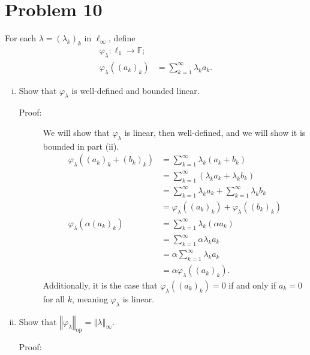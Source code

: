 \documentclass[8pt]{extarticle}
\newcommand{\norm}[1]{\left\Vert #1\right\Vert}
\begin{document}
  \section{Problem 10}%
  For each $\lambda = (\lambda_k)_k$ in $\ell_{\infty}$, define
  \begin{align*}
    \varphi_{\lambda}: \ell_1 \rightarrow \mathbb{F};\\
    \varphi_{\lambda}((a_k)_k) &= \sum_{k=1}^{\infty}\lambda_ka_k.
  \end{align*}
  \begin{enumerate}[(i)]
    \item Show that $\varphi_{\lambda}$ is well-defined and bounded linear.
      \begin{description}
        \item[Proof:] We will show that $\varphi_{\lambda}$ is linear, then well-defined, and we will show it is bounded in part (ii).
          \begin{align*}
            \varphi_{\lambda}((a_k)_k + (b_k)_k) &= \sum_{k=1}^{\infty}\lambda_k(a_k + b_k)\\
                                                 &= \sum_{k=1}^{\infty}\left(\lambda_ka_k + \lambda_kb_k\right)\\
                                                 &= \sum_{k=1}^{\infty}\lambda_ka_k + \sum_{k=1}^{\infty}\lambda_kb_k\\
                                                 &= \varphi_{\lambda}((a_k)_k) +\varphi_{\lambda}((b_k)_k)\\
            \varphi_{\lambda}(\alpha(a_k)_k) &= \sum_{k=1}^{\infty}\lambda_k(\alpha a_k)\\
                                             &= \sum_{k=1}^{\infty}\alpha\lambda_ka_k\\
                                             &= \alpha\sum_{k=1}^{\infty}\lambda_ka_k\\
                                             &= \alpha\varphi_{\lambda}((a_k)_k).
          \end{align*}
          Additionally, it is the case that $\varphi_{\lambda}((a_k)_k) = 0$ if and only if $a_k = 0$ for all $k$, meaning $\varphi_{\lambda}$ is linear.
      \end{description}
    \item Show that $\norm{\varphi_{\lambda}}_{\text{op}} = \norm{\lambda}_{\infty}$.
      \begin{description}
        \item[Proof:]

\end{description}
\end{enumerate}
\end{document}
